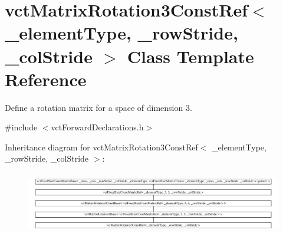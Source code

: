 \hypertarget{classvct_matrix_rotation3_const_ref}{}\section{vct\+Matrix\+Rotation3\+Const\+Ref$<$ \+\_\+element\+Type, \+\_\+row\+Stride, \+\_\+col\+Stride $>$ Class Template Reference}
\label{classvct_matrix_rotation3_const_ref}


Define a rotation matrix for a space of dimension 3.  




{\ttfamily \#include $<$vct\+Forward\+Declarations.\+h$>$}

Inheritance diagram for vct\+Matrix\+Rotation3\+Const\+Ref$<$ \+\_\+element\+Type, \+\_\+row\+Stride, \+\_\+col\+Stride $>$\+:\begin{figure}[H]
\begin{center}
\leavevmode
\includegraphics[height=2.747792cm]{dd/d42/classvct_matrix_rotation3_const_ref}
\end{center}
\end{figure}
